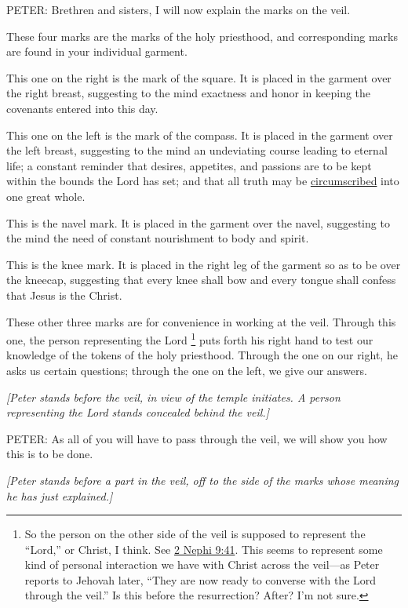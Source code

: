 			PETER: Brethren and sisters, I will now explain the marks on the veil.

			These four marks are the marks of the holy priesthood, and corresponding marks are found in your individual garment.

			This one on the right is the mark of the square. It is placed in the garment over the right breast, suggesting to the mind exactness and honor in keeping the covenants entered into this day.

			This one on the left is the mark of the compass. It is placed in the garment over the left breast, suggesting to the mind an undeviating course leading to eternal life; a constant reminder that desires, appetites, and passions are to be kept within the bounds the Lord has set; and that all truth may be \hyperref[CIRCUMSCRIBE]{circumscribed} into one great whole.

			This is the navel mark. It is placed in the garment over the navel, suggesting to the mind the need of constant nourishment to body and spirit.

			This is the knee mark. It is placed in the right leg of the garment so as to be over the kneecap, suggesting that every knee shall bow and every tongue shall confess that Jesus is the Christ.

			These other three marks are for convenience in working at the veil. Through this one, the person representing the Lord%
				\footnote{%
					\label{ENDOWMENT-lord}%
					So the person on the other side of the veil is supposed to represent the ``Lord,'' or Christ, I think. See \hyperref[2NEPHI-9-41]{2 Nephi 9:41}. This seems to represent some kind of personal interaction we have with Christ across the veil---as Peter reports to Jehovah later, ``They are now ready to converse with the Lord through the veil.'' Is this before the resurrection? After? I'm not sure.
					}
			puts forth his right hand to test our knowledge of the tokens of the holy priesthood. Through the one on our right, he asks us certain questions; through the one on the left, we give our answers.
			
			\textit{[Peter stands before the veil, in view of the temple initiates. A person representing the Lord stands concealed behind the veil.]}

			PETER: As all of you will have to pass through the veil, we will show you how this is to be done.

			\textit{[Peter stands before a part in the veil, off to the side of the marks whose meaning he has just explained.]}

